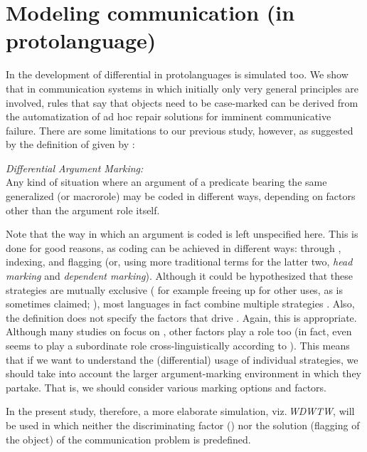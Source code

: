 \documentclass[output=paper]{LSP/langsci}
\begin{document}
\section{Modeling communication (in protolanguage)}\label{17-le-sec:Model}
In \cite{Lestradeetal2016Origin} the development of differential  in protolanguages is simulated too. We show that in communication systems in which initially only very general principles are involved, rules that say that  objects need to be case-marked can be derived from the automatization of ad hoc repair solutions for imminent communicative failure. There are some limitations to our previous study, however, as suggested by the definition of  given by :

\ea
\textit{Differential Argument Marking:}\\
Any kind of situation where an argument of a predicate bearing the same generalized  (or macrorole) may be coded in different ways, depending on factors other than the argument role itself.\\
\z

Note that the way in which an argument is coded is left unspecified here. This is done for good reasons, as coding can be achieved in different ways: through , indexing, and flagging (or, using more traditional terms for the latter two, \textit{head marking} and \textit{dependent marking}). Although it could be hypothesized that these strategies are mutually exclusive ( for example freeing up  for other uses, as is sometimes claimed; \cf  \citealt[15]{Blake2001Case}), most languages in fact combine multiple strategies \citep{Lestrade2015Interaction}. Also, the definition does not specify the factors that drive . Again, this is appropriate. Although many studies on  focus on , other factors play a role too (in fact,  even seems to play a subordinate role cross-linguistically according to \citealt{Sinnemki2014Typological}). This means that if we want to understand the (differential) usage of individual strategies, we should take into account the larger argument-marking environment in which they partake. That is, we should consider various marking options and factors. 

In the present study, therefore, a more elaborate simulation, viz.\,\textit{WDWTW}, will be used in which neither the discriminating factor () nor the solution (flagging of the object) of the communication problem is predefined. 
\end{document}
